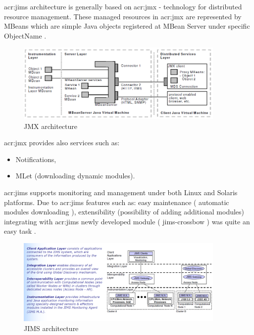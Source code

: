 \documentclass[11pt]{book}
\begin{document}
      \gls{acr:jims} architecture is generally based on \gls{acr:jmx} - technology for distributed resource management.
      These managed resources in \gls{acr:jmx} are represented by MBeans which are simple Java objects registered at MBean Server
      under specific ObjectName \cite{jims}.
    
      \begin{figure}[H]
        \begin{center}
          \includegraphics[width=0.9\textwidth]{img/jims/jmx.png}
        \end{center}
        \caption{JMX architecture \cite{jims}}
      \end{figure}
	
      \gls{acr:jmx} provides also services such as:

      \begin{itemize}
        \item Notifications,
        \item MLet (downloading dynamic modules).
      \end{itemize}
	
      \gls{acr:jims} supports monitoring and management under both Linux and Solaris
      platforms.  Due to \gls{acr:jims} features such as: easy maintenance ( automatic modules downloading ), extensibility
      (possibility of adding additional modules) integrating with \gls{acr:jims} newly developed module ( jims-crossbow ) was quite
      an easy task \cite{jims}.
    
      \begin{figure}[H]
        \begin{center}
          \includegraphics[width=0.9\textwidth]{img/jims/jims.png}
        \end{center}
        \caption{JIMS architecture \cite{jims}}
      \end{figure}
	 
\end{document}
